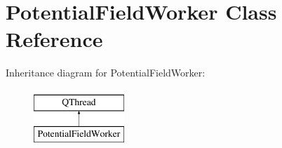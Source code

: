 \hypertarget{class_potential_field_worker}{\section{Potential\-Field\-Worker Class Reference}
\label{class_potential_field_worker}
}
Inheritance diagram for Potential\-Field\-Worker\-:\begin{figure}[H]
\begin{center}
\leavevmode
\includegraphics[height=2.000000cm]{class_potential_field_worker}
\end{center}
\end{figure}
